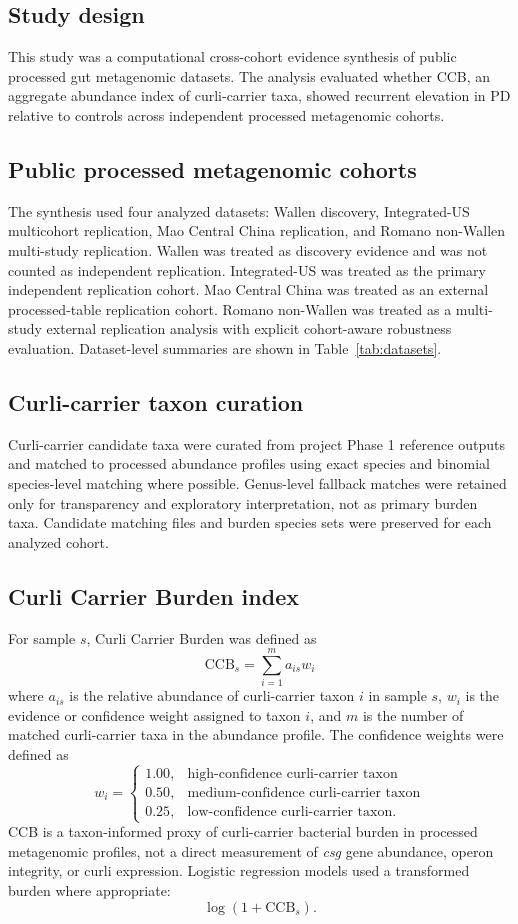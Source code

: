 \documentclass[12pt]{article}
\begin{document}
\subsection*{Study design}
This study was a computational cross-cohort evidence synthesis of public processed gut metagenomic datasets. The analysis evaluated whether CCB, an aggregate abundance index of curli-carrier taxa, showed recurrent elevation in PD relative to controls across independent processed metagenomic cohorts.

\subsection*{Public processed metagenomic cohorts}
The synthesis used four analyzed datasets: Wallen discovery, Integrated-US multicohort replication, Mao Central China replication, and Romano non-Wallen multi-study replication. Wallen was treated as discovery evidence and was not counted as independent replication. Integrated-US was treated as the primary independent replication cohort. Mao Central China was treated as an external processed-table replication cohort. Romano non-Wallen was treated as a multi-study external replication analysis with explicit cohort-aware robustness evaluation. Dataset-level summaries are shown in Table~\ref{tab:datasets}.

\subsection*{Curli-carrier taxon curation}
Curli-carrier candidate taxa were curated from project Phase 1 reference outputs and matched to processed abundance profiles using exact species and binomial species-level matching where possible. Genus-level fallback matches were retained only for transparency and exploratory interpretation, not as primary burden taxa. Candidate matching files and burden species sets were preserved for each analyzed cohort.

\subsection*{Curli Carrier Burden index}
For sample $s$, Curli Carrier Burden was defined as
\[
\mathrm{CCB}_{s} = \sum_{i=1}^{m} a_{is} w_i
\]
where $a_{is}$ is the relative abundance of curli-carrier taxon $i$ in sample $s$, $w_i$ is the evidence or confidence weight assigned to taxon $i$, and $m$ is the number of matched curli-carrier taxa in the abundance profile. The confidence weights were defined as
\[
w_i =
\begin{cases}
1.00, & \text{high-confidence curli-carrier taxon} \\
0.50, & \text{medium-confidence curli-carrier taxon} \\
0.25, & \text{low-confidence curli-carrier taxon}.
\end{cases}
\]
CCB is a taxon-informed proxy of curli-carrier bacterial burden in processed metagenomic profiles, not a direct measurement of \textit{csg} gene abundance, operon integrity, or curli expression. Logistic regression models used a transformed burden where appropriate:
\[
\log(1 + \mathrm{CCB}_{s}).
\]
\end{document}
